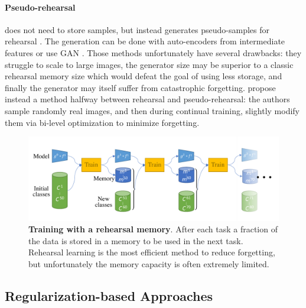 \paragraph{Pseudo-rehearsal} does not need to store samples, but instead generates pseudo-samples for
rehearsal \citep{lesort2019generative}. The generation can be done with auto-encoders from
intermediate features \citep{kemker2018fearnet,ayub2021eec} or use \ac{GAN}
\citep{shin2017deep_generative_replay}. Those methods unfortunately have several drawbacks: they
struggle to scale to large images, the generator size may be superior to a classic rehearsal memory
size which would defeat the goal of using less storage, and finally the generator may itself suffer
from catastrophic forgetting. \cite{liu2020mnemonics} propose instead a method halfway between
rehearsal and pseudo-rehearsal: the authors sample randomly real images, and then during continual
training, slightly modify them via bi-level optimization to minimize forgetting.


\begin{figure}[tb]
      \begin{center}
            \includegraphics[width=1.0\linewidth]{images/related/rehearsal}
      \end{center}
      \caption{\textbf{Training with a rehearsal memory}. After each task a fraction of the
            data is stored in a memory to be used in the next task. Rehearsal learning is the most
            efficient method to reduce forgetting, but unfortunately the memory capacity is often
            extremely limited.}
      \label{fig:related_protocol_rehearsal}
\end{figure}

\subsection{Regularization-based Approaches}
\label{sec:related_regul}


